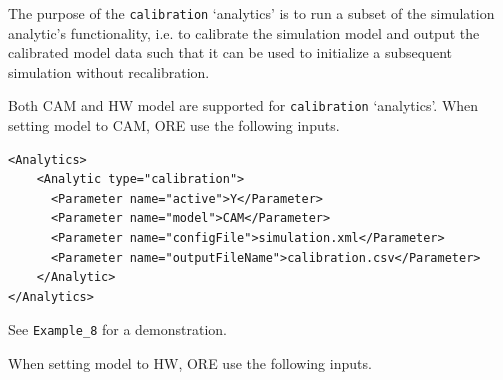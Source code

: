 %
%
%
%
%

\medskip The purpose of the {\tt calibration} `analytics' is to run a subset of the simulation analytic's functionality,
i.e. to calibrate the simulation model and output the calibrated model data such that it can be used to initialize
a subsequent simulation without recalibration.

Both CAM and HW model are supported for {\tt calibration} `analytics'. When setting model to CAM, ORE use the following inputs.

\begin{listing}[H]
\begin{verbatim}
<Analytics>
    <Analytic type="calibration">
      <Parameter name="active">Y</Parameter>
	  <Parameter name="model">CAM</Parameter>
      <Parameter name="configFile">simulation.xml</Parameter>
      <Parameter name="outputFileName">calibration.csv</Parameter>
    </Analytic>
</Analytics>
\end{verbatim}
\caption{ORE analytic: CAM calibration}
\label{lst:ore_calibration_CAM}
\end{listing}

See {\tt Example\_8} for a demonstration.

When setting model to HW, ORE use the following inputs.

